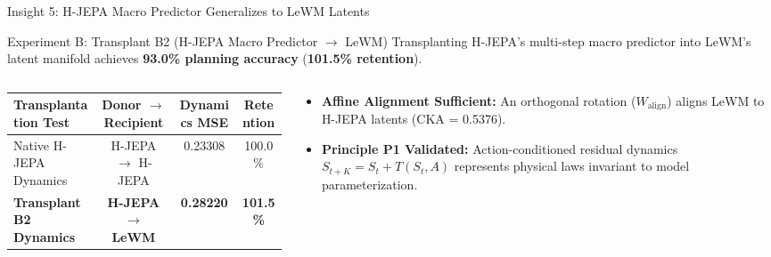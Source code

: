 \documentclass[aspectratio=169, 10pt]{beamer}
\begin{document}
\begin{frame}{Insight 5: H-JEPA Macro Predictor Generalizes to LeWM Latents}
  \begin{block}{Experiment B: Transplant B2 (H-JEPA Macro Predictor $\to$ LeWM)}
    Transplanting H-JEPA's multi-step macro predictor into LeWM's latent manifold achieves \textbf{93.0\% planning accuracy} (\textbf{101.5\% retention}).
  \end{block}
  \vspace{-0.2cm}
  \begin{columns}[T]
    \begin{column}{0.52\textwidth}
      \setlength{\tabcolsep}{2pt}
      \begin{table}
        \centering
        \scriptsize
        \begin{tabular}{lccc}
          \toprule
          \textbf{Transplantation Test} & \textbf{Donor $\to$ Recipient} & \textbf{Dynamics MSE} & \textbf{Retention} \\
          \midrule
          Native H-JEPA Dynamics & H-JEPA $\to$ H-JEPA & 0.23308 & 100.0\% \\
          \textbf{Transplant B2 Dynamics} & \textbf{H-JEPA $\to$ LeWM} & \textbf{0.28220} & \textbf{101.5\%} \\
          \bottomrule
        \end{tabular}
      \end{table}
    \end{column}
    \begin{column}{0.44\textwidth}
      \begin{itemize}
        \item \textbf{Affine Alignment Sufficient:} An orthogonal rotation ($W_{\text{align}}$) aligns LeWM to H-JEPA latents (CKA = 0.5376).
        \item \textbf{Principle P1 Validated:} Action-conditioned residual dynamics $S_{t+K} = S_t + T(S_t, A)$ represents physical laws invariant to model parameterization.
      \end{itemize}
    \end{column}
  \end{columns}
\end{frame}
\end{document}
